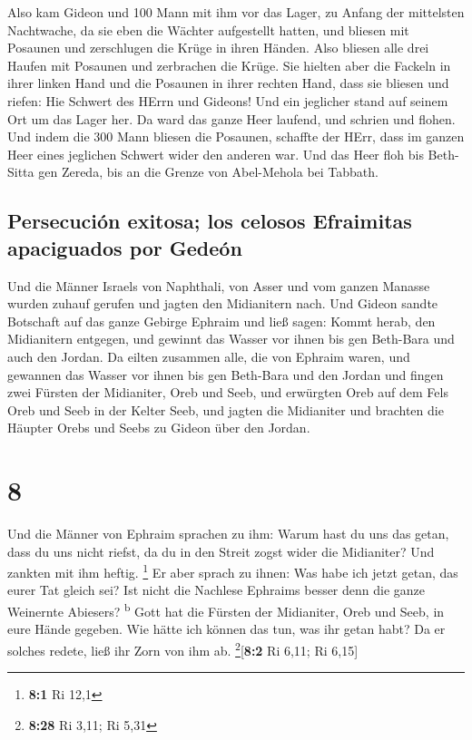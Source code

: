  Also kam Gideon und 100 Mann mit ihm vor das Lager, zu
Anfang der mittelsten Nachtwache, da sie eben die Wächter aufgestellt
hatten, und bliesen mit Posaunen und zerschlugen die Krüge in ihren
Händen.  Also bliesen alle drei Haufen mit Posaunen und
zerbrachen die Krüge. Sie hielten aber die Fackeln in ihrer linken Hand
und die Posaunen in ihrer rechten Hand, dass sie bliesen und riefen: Hie
Schwert des HErrn und Gideons!  Und ein jeglicher stand
auf seinem Ort um das Lager her. Da ward das ganze Heer laufend, und
schrien und flohen.  Und indem die 300 Mann bliesen die
Posaunen, schaffte der HErr, dass im ganzen Heer eines jeglichen Schwert
wider den anderen war. Und das Heer floh bis Beth-Sitta gen Zereda, bis
an die Grenze von Abel-Mehola bei Tabbath.

\hypertarget{persecuciuxf3n-exitosa-los-celosos-efraimitas-apaciguados-por-gedeuxf3n}{%
\subsection{Persecución exitosa; los celosos Efraimitas apaciguados por
Gedeón}\label{persecuciuxf3n-exitosa-los-celosos-efraimitas-apaciguados-por-gedeuxf3n}}

 Und die Männer Israels von Naphthali, von Asser und vom
ganzen Manasse wurden zuhauf gerufen und jagten den Midianitern nach.
 Und Gideon sandte Botschaft auf das ganze Gebirge
Ephraim und ließ sagen: Kommt herab, den Midianitern entgegen, und
gewinnt das Wasser vor ihnen bis gen Beth-Bara und auch den Jordan. Da
eilten zusammen alle, die von Ephraim waren, und gewannen das Wasser vor
ihnen bis gen Beth-Bara und den Jordan  und fingen zwei
Fürsten der Midianiter, Oreb und Seeb, und erwürgten Oreb auf dem Fels
Oreb und Seeb in der Kelter Seeb, und jagten die Midianiter und brachten
die Häupter Orebs und Seebs zu Gideon über den Jordan.

\hypertarget{section-7}{%
\section{8}\label{section-7}}

 Und die Männer von Ephraim sprachen zu ihm: Warum hast du
uns das getan, dass du uns nicht riefst, da du in den Streit zogst wider
die Midianiter? Und zankten mit ihm heftig. \footnote{\textbf{8:1} Ri
  12,1}  Er aber sprach zu ihnen: Was habe ich jetzt
getan, das eurer Tat gleich sei? Ist nicht die Nachlese Ephraims besser
denn die ganze Weinernte Abiesers? \textsuperscript{b} 
Gott hat die Fürsten der Midianiter, Oreb und Seeb, in eure Hände
gegeben. Wie hätte ich können das tun, was ihr getan habt? Da er solches
redete, ließ ihr Zorn von ihm ab. \footnote{\textbf{8:28} Ri 3,11; Ri
  5,31}{[}\textbf{8:2} Ri 6,11; Ri 6,15{]}

